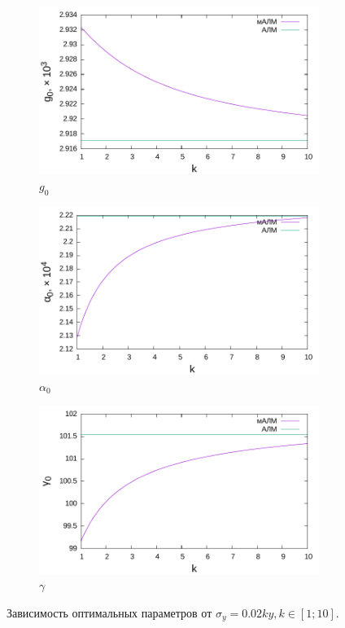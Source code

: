 \documentclass[11pt,a4paper]{article}
\begin{document}
\begin{figure}[h]
  \centering
  \begin{subfigure}[b]{0.7\textwidth}
    \includegraphics[width=\textwidth]{figs/levmar/convergence/convergence_10.txt_g.pdf}
    \caption{$g_0$}
  \end{subfigure}

  \begin{subfigure}[b]{0.7\textwidth}
    \includegraphics[width=\textwidth]{figs/levmar/convergence/convergence_10.txt_alpha.pdf}
    \caption{$\alpha_0$}
  \end{subfigure}

  \begin{subfigure}[b]{0.7\textwidth}
    \includegraphics[width=\textwidth]{figs/levmar/convergence/convergence_10.txt_gamma.pdf}
    \caption{$\gamma$}
  \end{subfigure}
  \caption{Зависимость оптимальных параметров от $\sigma_y = 0.02ky, k \in [1; 10]$.}
  \label{fig:conv_10_g}
\end{figure}
\end{document}

